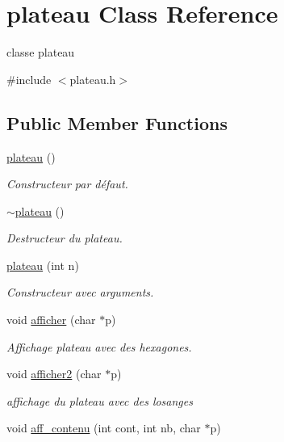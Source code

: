 \hypertarget{classplateau}{}\section{plateau Class Reference}
\label{classplateau}


classe plateau  




{\ttfamily \#include $<$plateau.\+h$>$}

\subsection*{Public Member Functions}
\begin{DoxyCompactItemize}
\item 
\hyperlink{classplateau_a4a106572264e08856397e78371cd047b}{plateau} ()
\begin{DoxyCompactList}\small\item\em Constructeur par défaut. \end{DoxyCompactList}\item 
\hyperlink{classplateau_a336a9f14762c3821cf717cca91f6ca86}{$\sim$plateau} ()
\begin{DoxyCompactList}\small\item\em Destructeur du plateau. \end{DoxyCompactList}\item 
\hyperlink{classplateau_a4e5cc7f71d0a559f595e48e2533a6a00}{plateau} (int n)
\begin{DoxyCompactList}\small\item\em Constructeur avec arguments. \end{DoxyCompactList}\item 
void \hyperlink{classplateau_a0b81b62bba2b707d81dd8c2815a8bfd0}{afficher} (char $\ast$p)
\begin{DoxyCompactList}\small\item\em Affichage plateau avec des hexagones. \end{DoxyCompactList}\item 
void \hyperlink{classplateau_a999e3e8e2e9b4810fb42dc7e39193019}{afficher2} (char $\ast$p)
\begin{DoxyCompactList}\small\item\em affichage du plateau avec des losanges \end{DoxyCompactList}\item 
void \hyperlink{classplateau_ad7ba541e3bee6bb45ab3eda6c48242c0}{aff\+\_\+contenu} (int cont, int nb, char $\ast$p)

\end{DoxyCompactItemize}
